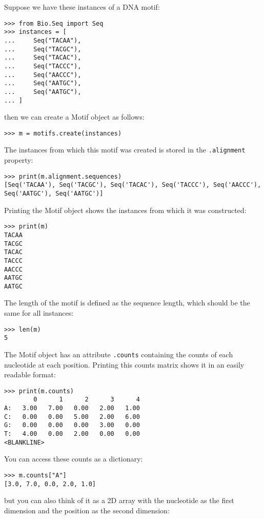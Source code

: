 Suppose we have these instances of a DNA motif:

\begin{verbatim}
>>> from Bio.Seq import Seq
>>> instances = [
...     Seq("TACAA"),
...     Seq("TACGC"),
...     Seq("TACAC"),
...     Seq("TACCC"),
...     Seq("AACCC"),
...     Seq("AATGC"),
...     Seq("AATGC"),
... ]
\end{verbatim}
then we can create a Motif object as follows:

\begin{verbatim}
>>> m = motifs.create(instances)
\end{verbatim}
The instances from which this motif was created is stored in the \verb+.alignment+ property:
\begin{verbatim}
>>> print(m.alignment.sequences)
[Seq('TACAA'), Seq('TACGC'), Seq('TACAC'), Seq('TACCC'), Seq('AACCC'), Seq('AATGC'), Seq('AATGC')]
\end{verbatim}
Printing the Motif object shows the instances from which it was constructed:
\begin{verbatim}
>>> print(m)
TACAA
TACGC
TACAC
TACCC
AACCC
AATGC
AATGC
\end{verbatim}
The length of the motif is defined as the sequence length, which should be the same for all instances:

\begin{verbatim}
>>> len(m)
5
\end{verbatim}
The Motif object has an attribute \verb+.counts+ containing the counts of each
nucleotide at each position. Printing this counts matrix shows it in an easily readable format:

\begin{verbatim}
>>> print(m.counts)
        0      1      2      3      4
A:   3.00   7.00   0.00   2.00   1.00
C:   0.00   0.00   5.00   2.00   6.00
G:   0.00   0.00   0.00   3.00   0.00
T:   4.00   0.00   2.00   0.00   0.00
<BLANKLINE>
\end{verbatim}

You can access these counts as a dictionary:

\begin{verbatim}
>>> m.counts["A"]
[3.0, 7.0, 0.0, 2.0, 1.0]
\end{verbatim}
but you can also think of it as a 2D array with the nucleotide as the first
dimension and the position as the second dimension:

